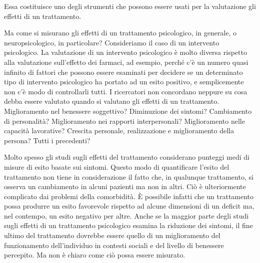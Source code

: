 Essa costituisce uno degli strumenti che possono essere usati per la valutazione gli effetti di un trattamento.

Ma come si misurano gli effetti di un trattamento psicologico, in generale, o neuropsicologico, in particolare?
Consideriamo il caso di un intervento psicologico.
La valutazione di un intervento psicologico è molto diversa rispetto alla valutazione sull'effetto dei farmaci, ad esempio, perché c'è un numero quasi infinito di fattori che possono essere esaminati per decidere se un determinato tipo di intervento psicologico ha portato ad un esito positivo, e semplicemente non c'è modo di controllarli tutti. 
I ricercatori non concordano neppure su cosa debba essere valutato quando si valutano gli effetti di un trattamento.  
Miglioramento nel benessere soggettivo? 
Diminuzione dei sintomi?
Cambiamento di personalità? 
Miglioramento nei rapporti interpersonali? 
Miglioramento nelle capacità lavorative?
Crescita personale, realizzazione e miglioramento della persona? 
Tutti i precedenti?

Molto spesso gli studi sugli effetti del trattamento considerano punteggi medi di misure di esito basate sui sintomi. 
Questo modo di quantificare l'esito del trattamento non tiene in considerazione il fatto che, in qualunque trattamento, si osserva un cambiamento in alcuni pazienti ma non in altri.
Ciò è ulteriormente complicato dai problemi della comorbidità.
È possibile infatti che un trattamento possa produrre un esito favorevole rispetto ad alcune dimensioni di un deficit ma, nel contempo, un esito negativo per altre.
Anche se la maggior parte degli studi sugli effetti di un trattamento psicologico esamina la riduzione dei sintomi, il fine ultimo del trattamento dovrebbe essere quello di un miglioramento del funzionamento dell'individuo in contesti sociali e del livello di benessere percepito. 
Ma non è chiaro come ciò possa essere misurato.


